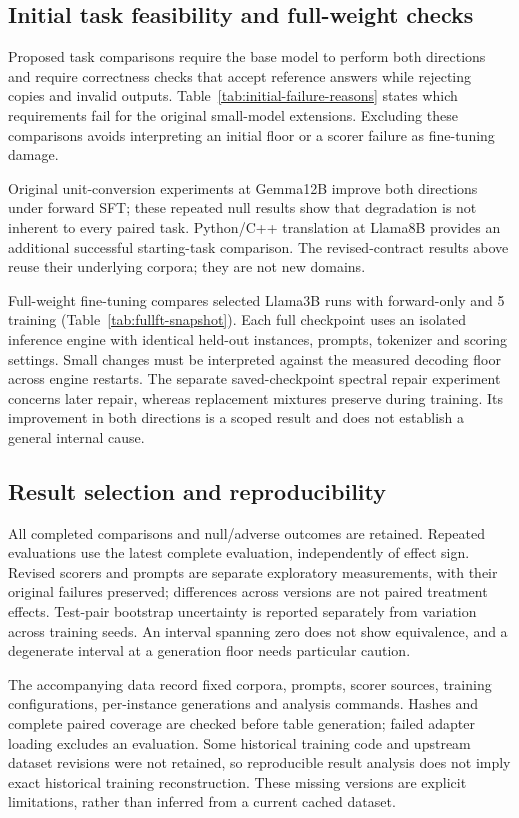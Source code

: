 \subsection{Initial task feasibility and full-weight checks}
\label{app:boundaries}
Proposed task comparisons require the base model to perform both directions and require
correctness checks that accept reference answers while rejecting copies and invalid outputs.
Table~\ref{tab:initial-failure-reasons} states which requirements fail for the original
small-model extensions. Excluding these comparisons avoids interpreting an initial floor
or a scorer failure as fine-tuning damage.



Original unit-conversion experiments at Gemma12B improve both directions under forward SFT;
these repeated null results show that degradation is not inherent to every paired task.
Python/C++ translation at Llama8B provides an additional successful starting-task comparison.
The revised-contract results above reuse their underlying corpora; they are not new domains.

Full-weight fine-tuning compares selected Llama3B runs with forward-only and 5\\%
training (Table~\ref{tab:fullft-snapshot}). Each full checkpoint uses an isolated inference
engine with identical held-out instances, prompts, tokenizer and scoring settings. Small
changes must be interpreted against the measured decoding floor across engine restarts.
The separate saved-checkpoint spectral repair experiment concerns later repair, whereas
replacement mixtures preserve during training. Its improvement in both directions is a
scoped result and does not establish a general internal cause.


\subsection{Result selection and reproducibility}
\label{app:reproducibility}
All completed comparisons and null/adverse outcomes are retained. Repeated evaluations use
the latest complete evaluation, independently of effect sign. Revised scorers and prompts
are separate exploratory measurements, with their original failures preserved; differences
across versions are not paired treatment effects. Test-pair bootstrap uncertainty is reported
separately from variation across training seeds. An interval spanning zero does not show
equivalence, and a degenerate interval at a generation floor needs particular caution.

The accompanying data record fixed corpora, prompts, scorer sources, training configurations,
per-instance generations and analysis commands. Hashes and complete paired coverage are
checked before table generation; failed adapter loading excludes an evaluation. Some
historical training code and upstream dataset revisions were not retained, so reproducible
result analysis does not imply exact historical training reconstruction. These missing
versions are explicit limitations, rather than inferred from a current cached dataset.
